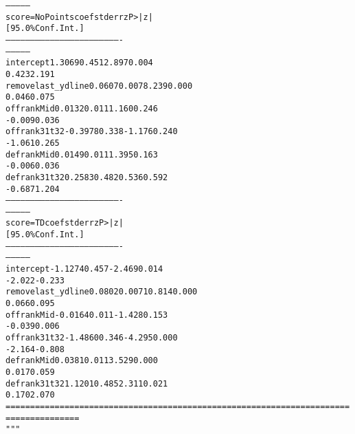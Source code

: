 \documentclass[letterpaper,10pt,english]{/anaconda/lib/python2.7/site-packages/sphinx/texinputs/sphinxhowto}
\newenvironment{InvisibleVerbatim}
        {\begin{mdframed}[leftmargin=0.1\linewidth,innerleftmargin=3pt,innerrightmargin=3pt, userdefinedwidth=1\linewidth, linewidth=0pt, linecolor=white, usetwoside=false]}
        {\end{mdframed}}
\begin{document}
\begin{InvisibleVerbatim}
\begin{alltt}
---------------
   score=NoPoints       coef    std err          z      P>|z|
[95.0\% Conf. Int.]
----------------------------------------------------------------------
---------------
intercept             1.3069      0.451      2.897      0.004
0.423     2.191
removelast\_ydline     0.0607      0.007      8.239      0.000
0.046     0.075
offrankMid            0.0132      0.011      1.160      0.246
-0.009     0.036
offrank31t32         -0.3978      0.338     -1.176      0.240
-1.061     0.265
defrankMid            0.0149      0.011      1.395      0.163
-0.006     0.036
defrank31t32          0.2583      0.482      0.536      0.592
-0.687     1.204
----------------------------------------------------------------------
---------------
         score=TD       coef    std err          z      P>|z|
[95.0\% Conf. Int.]
----------------------------------------------------------------------
---------------
intercept            -1.1274      0.457     -2.469      0.014
-2.022    -0.233
removelast\_ydline     0.0802      0.007     10.814      0.000
0.066     0.095
offrankMid           -0.0164      0.011     -1.428      0.153
-0.039     0.006
offrank31t32         -1.4860      0.346     -4.295      0.000
-2.164    -0.808
defrankMid            0.0381      0.011      3.529      0.000
0.017     0.059
defrank31t32          1.1201      0.485      2.311      0.021
0.170     2.070
======================================================================
===============
"""\end{alltt}

            \end{InvisibleVerbatim}
            
        
    



    

        
        

            
\end{document}
